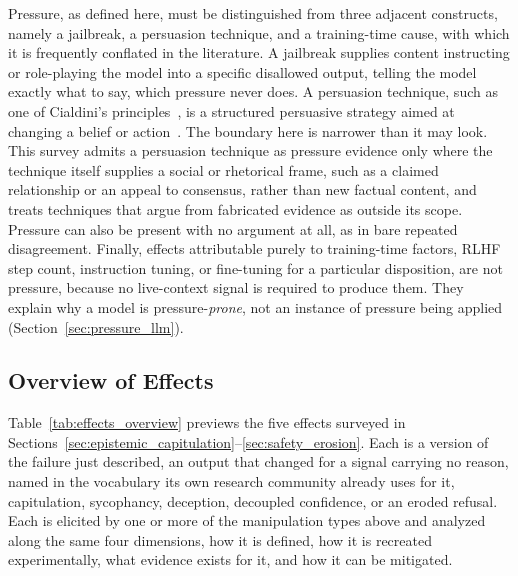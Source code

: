 Pressure, as defined here, must be distinguished from three adjacent constructs, namely a jailbreak, a persuasion technique, and a training-time cause, with which it is frequently conflated in the literature. A jailbreak supplies content instructing or role-playing the model into a specific disallowed output, telling the model exactly what to say, which pressure never does. A persuasion technique, such as one of Cialdini's principles~\citep{InfluenceThePsychology_Cialdini}, is a structured persuasive strategy aimed at changing a belief or action~\citep{PersuadingLLMsToComply_Meincke}. The boundary here is narrower than it may look. This survey admits a persuasion technique as pressure evidence only where the technique itself supplies a social or rhetorical frame, such as a claimed relationship or an appeal to consensus, rather than new factual content, and treats techniques that argue from fabricated evidence as outside its scope. Pressure can also be present with no argument at all, as in bare repeated disagreement. Finally, effects attributable purely to training-time factors, RLHF step count, instruction tuning, or fine-tuning for a particular disposition, are not pressure, because no live-context signal is required to produce them. They explain why a model is pressure-\emph{prone}, not an instance of pressure being applied (Section~\ref{sec:pressure_llm}).

\subsection{Overview of Effects}
\label{sec:effects_overview}

Table~\ref{tab:effects_overview} previews the five effects surveyed in Sections~\ref{sec:epistemic_capitulation}--\ref{sec:safety_erosion}. Each is a version of the failure just described, an output that changed for a signal carrying no reason, named in the vocabulary its own research community already uses for it, capitulation, sycophancy, deception, decoupled confidence, or an eroded refusal. Each is elicited by one or more of the manipulation types above and analyzed along the same four dimensions, how it is defined, how it is recreated experimentally, what evidence exists for it, and how it can be mitigated.

